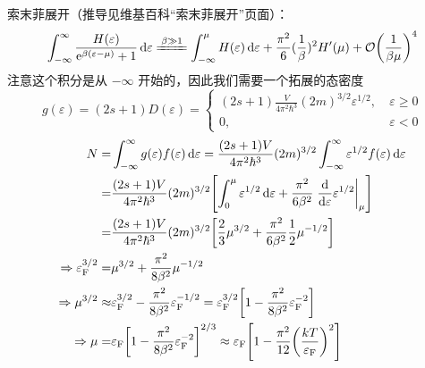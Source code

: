 索末菲展开（推导见维基百科“索末菲展开”页面）：\[
    \int_{- \infty}^{\infty} \frac{H(\varepsilon)}{\mathrm{e}^{\beta (\varepsilon - \mu)} + 1} \dd{\varepsilon} \xlongequal{\beta \gg 1} \int_{- \infty}^{\mu} H(\varepsilon) \dd{\varepsilon} + \frac{\pi^2}{6} (\frac{1}{\beta})^2 H'(\mu) + \mathcal{O} \qty(\frac{1}{\beta \mu})^4
\] 注意这个积分是从 $- \infty$ 开始的，因此我们需要一个拓展的态密度 \[
    g(\varepsilon) = (2 s + 1) D(\varepsilon) = \begin{cases}
        (2 s + 1) \frac{V}{4 \pi^2 \hbar^3} (2 m)^{3/2} \varepsilon^{1/2}, & \ \varepsilon \geq 0 \\
        0,                                                                 & \ \varepsilon < 0
    \end{cases} \] \begin{align*}
    N =                                        & \int_{- \infty}^{\infty} g(\varepsilon) f(\varepsilon) \dd{\varepsilon} = \frac{(2 s + 1) V}{4 \pi^2 \hbar^3} (2 m)^{3 / 2} \int_{- \infty}^{\infty} \varepsilon^{1 / 2} f(\varepsilon) \dd{\varepsilon}             \\
    =                                          & \frac{(2 s + 1) V}{4 \pi^2 \hbar^3} (2 m)^{3 / 2} \qty[\int_0^{\mu} \varepsilon^{1/2} \dd{\varepsilon} + \frac{\pi^2}{6 \beta^2} \left.\dv{\varepsilon} \varepsilon^{1/2} \right|_{\mu}]                             \\
    =                                          & \frac{(2 s + 1) V}{4 \pi^2 \hbar^3} (2 m)^{3 / 2} \qty[\frac{2}{3} \mu^{3/2} + \frac{\pi^2}{6 \beta^2} \frac{1}{2} \mu^{- 1 / 2}]                                                                                    \\
    \Rightarrow \varepsilon_{\text{F}}^{3/2} = & \mu^{3/2} + \frac{\pi^2}{8 \beta^2} \mu^{- 1 / 2}                                                                                                                                                                    \\
    \Rightarrow \mu^{3/2} \approx              & \varepsilon_{\text{F}}^{3/2} - \frac{\pi^2}{8 \beta^2} \varepsilon_{\text{F}}^{- 1 / 2} = \varepsilon_{\text{F}}^{3/2} \qty[1 - \frac{\pi^2}{8 \beta^2} \varepsilon_{\text{F}}^{- 2}]                                \\
    \Rightarrow \mu =                          & \varepsilon_{\text{F}} \qty[1 - \frac{\pi^2}{8 \beta^2} \varepsilon_{\text{F}}^{- 2}]^{2 / 3} \approx \varepsilon_{\text{F}} \qty[1 - \frac{\pi^2}{12} \qty(\frac{k T}{\varepsilon_{\text{F}}})^2]                   \\

\end{align*}

